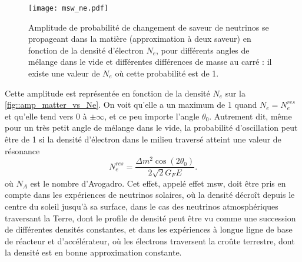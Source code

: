         \begin{figure}[htpb]
          \centering
          \texttt{[image: msw\_ne.pdf]}
          \caption[L'effet de résonnance MSW]{\label{fig::amp_matter_vs_Ne}Amplitude de probabilité de changement de saveur de neutrinos se propageant dans la matière (approximation à deux saveur) en fonction de la densité d'électron $N_e$, pour différents angles de mélange dans le vide et différentes différences de masse au carré : il existe une valeur de $N_e$ où cette probabilité est de 1.}
        \end{figure}
        Cette amplitude est représentée en fonction de la densité $N_e$ sur la \autoref{fig::amp_matter_vs_Ne}. On voit qu'elle a un maximum de 1 quand $N_e = N_e^{res}$ et qu'elle tend vers 0 à $\pm\infty$, et ce peu importe l'angle $\theta_0$. Autrement dit, même pour un très petit angle de mélange dans le vide, la probabilité d'oscillation peut être de 1 si la densité d'électron dans le milieu traversé atteint une valeur de résonance
        \begin{equation}\label{eq::MSW_condition}
          N_e^{res}  =\frac{\Delta m^2\cos(2\theta_0)}{2\sqrt{2}G_F E}.
        \end{equation}
        où $N_A$ est le nombre d'Avogadro.
        Cet effet, appelé effet \gls{msw}, doit être pris en compte dans les expériences de neutrinos solaires, où la densité décroît depuis le centre du soleil jusqu'à sa surface, dans le cas des neutrinos atmosphériques traversant la Terre, dont le profile de densité peut être vu comme une succession de différentes densités constantes, et dans les expériences à longue ligne de base de réacteur et d'accélérateur, où les électrons traversent la croûte terrestre, dont la densité est en bonne approximation constante.
        
        
